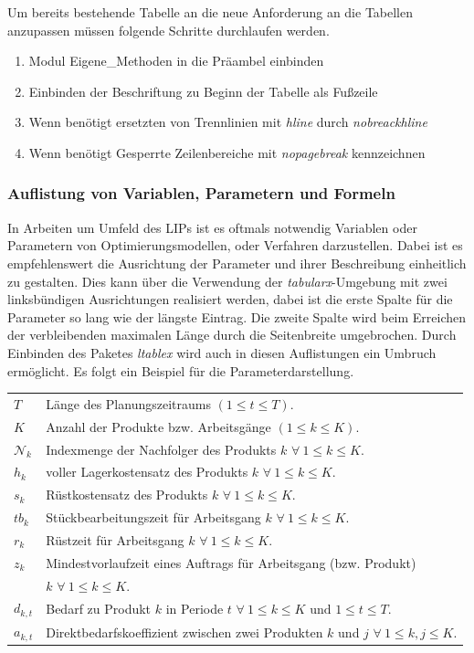 		Um bereits bestehende Tabelle an die neue Anforderung an die Tabellen anzupassen müssen folgende Schritte durchlaufen werden.

		\begin{enumerate}
			\item Modul Eigene\_Methoden in die Präambel einbinden
			\item Einbinden der Beschriftung zu Beginn der Tabelle als Fußzeile
			\item Wenn benötigt ersetzten von Trennlinien mit \textit{hline} durch \textit{nobreackhline}
			\item Wenn benötigt Gesperrte Zeilenbereiche mit \textit{nopagebreak} kennzeichnen
		\end{enumerate}

		\subsubsection{Auflistung von Variablen, Parametern und Formeln}
		\label{ch:parameter}
		In Arbeiten um Umfeld des LIPs ist es oftmals notwendig Variablen oder Parametern von Optimierungsmodellen, oder Verfahren darzustellen. Dabei ist es empfehlenswert die Ausrichtung der Parameter und ihrer Beschreibung einheitlich zu gestalten. Dies kann über die Verwendung der \textit{tabularx}-Umgebung mit zwei linksbündigen Ausrichtungen realisiert werden, dabei ist die erste Spalte für die Parameter so lang wie der längste Eintrag. Die zweite Spalte wird beim Erreichen der verbleibenden maximalen Länge durch die Seitenbreite umgebrochen. Durch Einbinden des Paketes \textit{ltablex} wird auch in diesen Auflistungen ein Umbruch ermöglicht. Es folgt ein Beispiel für die Parameterdarstellung.
		\begin{tabularx}{\linewidth}{@{}p{1 cm}X}  %
			$T$ & Länge des Planungszeitraums $(1 \le t \le T)$. \\
			$K$ & Anzahl der Produkte bzw. Arbeitsgänge $(1 \le k \le K)$. \\
			$\mathcal{N}_{k}$ & Indexmenge der Nachfolger des Produkts $k$ $\forall~ 1 \le k \le K$. \\
			$h_k$ & voller Lagerkostensatz des Produkts $k$ $\forall~ 1 \le k \le K$. \\
			$s_k$ & Rüstkostensatz des Produkts $k$ $\forall~ 1 \le k \le K$. \\
			$tb_k$ & Stückbearbeitungszeit für Arbeitsgang $k$ $\forall~ 1 \le k \le K$. \\
			$r_k$ & Rüstzeit für Arbeitsgang $k$ $\forall~ 1 \le k \le K$. \\
			$z_k$ & Mindestvorlaufzeit eines Auftrags für Arbeitsgang (bzw. Produkt) \\ 
            & $k$ $\forall~ 1 \le k \le K$. \\
			$d_{k,t}$ & Bedarf zu Produkt $k$ in Periode $t$ $\forall~ 1 \le k \le K \text{ und } 1 \le t \le T$. \\
			$a_{k,t}$ & Direktbedarfskoeffizient zwischen zwei Produkten $k$ und $j$ $\forall~ 1 \le k, j \le K$. \\
		\end{tabularx}

